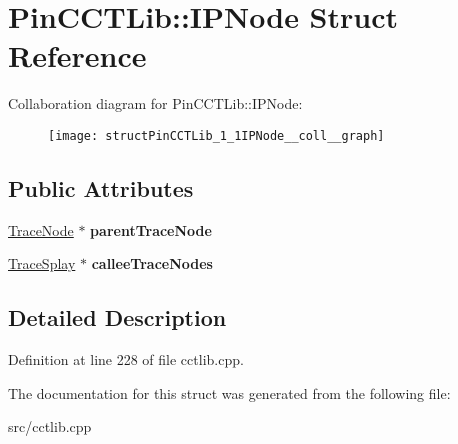 \hypertarget{structPinCCTLib_1_1IPNode}{\section{Pin\-C\-C\-T\-Lib\-:\-:I\-P\-Node Struct Reference}
\label{structPinCCTLib_1_1IPNode}
}


Collaboration diagram for Pin\-C\-C\-T\-Lib\-:\-:I\-P\-Node\-:
\nopagebreak
\begin{figure}[H]
\begin{center}
\leavevmode
\texttt{[image: structPinCCTLib\_1\_1IPNode\_\_coll\_\_graph]}
\end{center}
\end{figure}
\subsection*{Public Attributes}
\begin{DoxyCompactItemize}
\item 
\hypertarget{structPinCCTLib_1_1IPNode_a5911e698dc53a7262966601a56525bde}{\hyperlink{structPinCCTLib_1_1TraceNode}{Trace\-Node} $\ast$ {\bfseries parent\-Trace\-Node}}\label{structPinCCTLib_1_1IPNode_a5911e698dc53a7262966601a56525bde}

\item 
\hypertarget{structPinCCTLib_1_1IPNode_a666b3581aca41a0dbd16ed0eff87e50c}{\hyperlink{structPinCCTLib_1_1TraceSplay}{Trace\-Splay} $\ast$ {\bfseries callee\-Trace\-Nodes}}\label{structPinCCTLib_1_1IPNode_a666b3581aca41a0dbd16ed0eff87e50c}

\end{DoxyCompactItemize}


\subsection{Detailed Description}


Definition at line 228 of file cctlib.\-cpp.



The documentation for this struct was generated from the following file\-:\begin{DoxyCompactItemize}
\item 
src/cctlib.\-cpp\end{DoxyCompactItemize}
